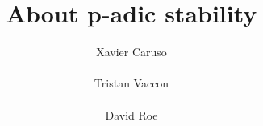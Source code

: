 \documentclass{sig-alternate}
\begin{document}
\newtheorem{theo}{Theorem}[section]
\newtheorem{lem}[theo]{Lemma}
\newtheorem{prop}[theo]{Proposition}
\newtheorem{cor}[theo]{Corollary}
\newtheorem{quest}[theo]{Question}
\newtheorem{rem}[theo]{Remark}
\newtheorem{ex}[theo]{Example}
\newtheorem{deftn}[theo]{Definition}
\newtheorem{rmk}[theo]{Remark}

\newcommand{\N}{\mathbb N}
\newcommand{\Z}{\mathbb Z}
\newcommand{\Zp}{\Z_p}
\newcommand{\Q}{\mathbb Q}
\newcommand{\Qp}{\Q_p}
\newcommand{\Fp}{\mathbb{F}_p}
\newcommand{\R}{\mathbb R}
\renewcommand{\O}{\mathcal O}
\newcommand{\OK}{\mathcal{O}_K}
\newcommand{\XX}{\mathbf X}
\newcommand{\trans}{{}^{\text t}}
\newcommand{\T}{\mathcal{T}}

\renewcommand{\prec}{\text{\rm prec}}

\newcommand{\id}{\textrm{id}}
\newcommand{\Epi}{\textrm{Epi}}
\renewcommand{\c}{\text{\rm c}}

\newcommand{\DI}{\text{\rm DI}}
\newcommand{\II}{\text{\rm II}}

\newcommand{\lb}{\ensuremath{\llbracket}}
\newcommand{\rb}{\ensuremath{\rrbracket}}
\newcommand{\lp}{(\!(}
\newcommand{\rp}{)\!)}
\newcommand{\col}{\: : \:}

\def\todo#1{\ \!\!{\color{red} #1}}
\def\todofor#1#2{\ \!\!{\color{purple} {\bf #1}: #2}}

\def\binom#1#2{\Big(\begin{array}{cc} #1 \\ #2 \end{array}\Big)}

\title{About p-adic stability}

\author{
\alignauthor Xavier Caruso\\
  \\
\alignauthor Tristan Vaccon\\
  \\
\alignauthor David Roe \\
  \\
}

\maketitle
\end{document}
